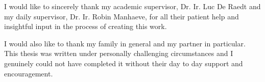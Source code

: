 I would like to sincerely thank my academic supervisor, Dr. Ir. Luc De Raedt and my daily supervisor, Dr. Ir. Robin Manhaeve, for all their patient help and insightful input in the process of creating this work. \par
I would also like to thank my family in general and my partner in particular. This thesis was written under personally challenging circumstances and I genuinely could not have completed it without their day to day support and encouragement.